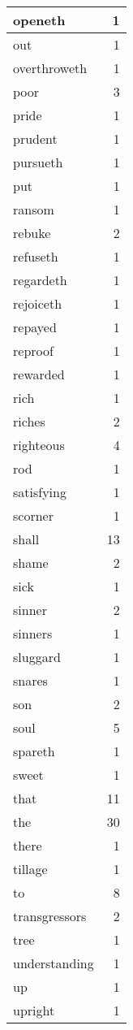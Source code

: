 \begin{center}
\begin{longtable}{l|r}
openeth & 1\\ \hline 
out & 1\\ \hline 
overthroweth & 1\\ \hline 
poor & 3\\ \hline 
pride & 1\\ \hline 
prudent & 1\\ \hline 
pursueth & 1\\ \hline 
put & 1\\ \hline 
ransom & 1\\ \hline 
rebuke & 2\\ \hline 
refuseth & 1\\ \hline 
regardeth & 1\\ \hline 
rejoiceth & 1\\ \hline 
repayed & 1\\ \hline 
reproof & 1\\ \hline 
rewarded & 1\\ \hline 
rich & 1\\ \hline 
riches & 2\\ \hline 
righteous & 4\\ \hline 
rod & 1\\ \hline 
satisfying & 1\\ \hline 
scorner & 1\\ \hline 
shall & 13\\ \hline 
shame & 2\\ \hline 
sick & 1\\ \hline 
sinner & 2\\ \hline 
sinners & 1\\ \hline 
sluggard & 1\\ \hline 
snares & 1\\ \hline 
son & 2\\ \hline 
soul & 5\\ \hline 
spareth & 1\\ \hline 
sweet & 1\\ \hline 
that & 11\\ \hline 
the & 30\\ \hline 
there & 1\\ \hline 
tillage & 1\\ \hline 
to & 8\\ \hline 
transgressors & 2\\ \hline 
tree & 1\\ \hline 
understanding & 1\\ \hline 
up & 1\\ \hline 
upright & 1\\ \hline 

\end{longtable}
\end{center}
